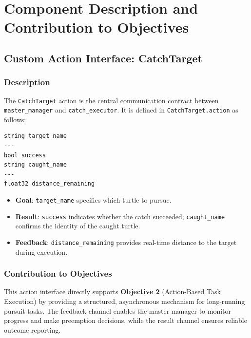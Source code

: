 \documentclass[12pt,a4paper]{article}
\begin{document}
\section{Component Description and Contribution to Objectives}
\label{sec:components}

\subsection{Custom Action Interface: CatchTarget}
\label{subsec:action}

\subsubsection{Description}

The \texttt{CatchTarget} action is the central communication contract between \texttt{master\_manager} and \texttt{catch\_executor}. It is defined in \texttt{CatchTarget.action} as follows:

\begin{lstlisting}[language={},title={CatchTarget.action}]
string target_name
---
bool success
string caught_name
---
float32 distance_remaining
\end{lstlisting}

\begin{itemize}
  \item \textbf{Goal}: \texttt{target\_name} specifies which turtle to pursue.
  \item \textbf{Result}: \texttt{success} indicates whether the catch succeeded; \texttt{caught\_name} confirms the identity of the caught turtle.
  \item \textbf{Feedback}: \texttt{distance\_remaining} provides real-time distance to the target during execution.
\end{itemize}

\subsubsection{Contribution to Objectives}

This action interface directly supports \textbf{Objective 2} (Action-Based Task Execution) by providing a structured, asynchronous mechanism for long-running pursuit tasks. The feedback channel enables the master manager to monitor progress and make preemption decisions, while the result channel ensures reliable outcome reporting.
\end{document}

